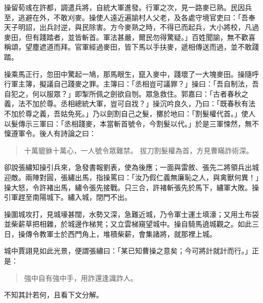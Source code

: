 操留荀彧在許都，調遣兵將，自統大軍進發。行軍之次，見一路麥已熟。民因兵至，逃避在外，不敢刈麥。操使人遠近遍諭村人父老，及各處守境官吏曰：「吾奉天子明詔，出兵討逆，與民除害。方今麥熟之時，不得已而起兵，大小將校，凡過麥田，但有踐踏者，並皆斬首。軍法甚嚴，爾民勿得驚疑。」百姓聞諭，無不歡喜稱頌，望塵遮道而拜。官軍經過麥田，皆下馬以手扶麥，遞相傳送而過，並不敢踐踏。

操乘馬正行，忽田中驚起一鳩，那馬眼生，竄入麥中，踐壞了一大塊麥田。操隨呼行軍主簿，擬議自己踐麥之罪。主簿曰：「丞相豈可議罪？」操曰：「吾自制法，吾自犯之，何以服眾？」即掣所佩之劍欲自刎。眾急救住。郭嘉曰：「古者春秋之義，法不加於尊。丞相總統大軍，豈可自戕？」操沉吟良久，乃曰：「既春秋有法不加於尊之義，吾姑免死。」乃以劍割自己之髮，擲於地曰：「割髮權代首。」使人以髮傳示三軍曰：「丞相踐麥，本當斬首號令，今割髮以代。」於是三軍悚然，無不懍遵軍令。後人有詩論之曰：

\begin{quote}
十萬貔貅十萬心，一人號令眾難禁。
拔刀割髮權為首，方見曹瞞詐術深。
\end{quote}

卻說張繡知操引兵來，急發書報劉表，使為後應；一面與雷敘、張先二將領兵出城迎敵。兩陣對圓，張繡出馬，指操罵曰：「汝乃假仁義無廉恥之人，與禽獸何異！」操大怒，令許褚出馬，繡令張先接戰。只三合，許褚斬張先於馬下，繡軍大敗。操引軍趕至南陽城下。繡入城，閉門不出。

操圍城攻打，見城壕甚闊，水勢又深，急難近城，乃令軍士運土填濠；又用土布袋並柴薪草把相雜，於城邊作梯凳；又立雲梯窺望城中。操自騎馬遶城觀之。如此三日，操傳令教軍士於西門角上，堆積柴薪，會集諸將，就那裡上城。

城中賈詡見如此光景，便謂張繡曰：「某已知曹操之意矣；今可將計就計而行。」正是：

\begin{quote}
強中自有強中手，用詐還逢識詐人。
\end{quote}

不知其計若何，且看下文分解。
